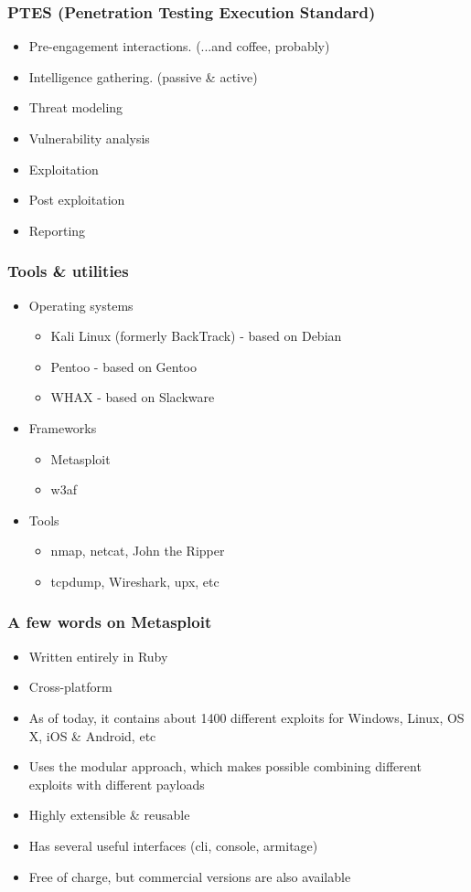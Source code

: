 \documentclass{beamer}
\begin{document}
\begin{frame}
	\frametitle{PTES (Penetration Testing Execution Standard)}
	\begin{itemize} \itemsep3ex
	\item<2-> Pre-engagement interactions. (...and coffee, probably)
	\item<3-> Intelligence gathering. (passive \& active)
	\item<4-> Threat modeling
	\item<5-> Vulnerability analysis
	\item<6-> Exploitation
	\item<7-> Post exploitation
	\item<8> Reporting
	\end{itemize}
\end{frame}

\begin{frame}
	\frametitle{Tools \& utilities}
	\begin{itemize} \itemsep3ex
	\item<2-> Operating systems
		\begin{itemize} \itemsep1ex
		\item<3-> Kali Linux (formerly BackTrack) - based on Debian
		\item<3-> Pentoo - based on Gentoo
		\item<3-> WHAX - based on Slackware
		\end{itemize}
	\item<4-> Frameworks
		\begin{itemize} \itemsep1ex
		\item<5-> Metasploit
		\item<5-> w3af
		\end{itemize}
	\item<6-> Tools
		\begin{itemize} \itemsep1ex
		\item<7-> nmap, netcat, John the Ripper
		\item<7-> tcpdump, Wireshark, upx, etc
		\end{itemize}
	\end{itemize}
\end{frame}

\begin{frame}
	\frametitle{A few words on Metasploit}
	\begin{itemize} \itemsep2ex
	\item<2-> Written entirely in Ruby
	\item<3-> Cross-platform
	\item<4-> As of today, it contains about 1400 different exploits for Windows, Linux, OS X, iOS \& Android, etc
	\item<5-> Uses the modular approach, which makes possible combining different exploits with different payloads
	\item<6-> Highly extensible \& reusable
	\item<7-> Has several useful interfaces (cli, console, armitage)
	\item<8> Free of charge, but commercial versions are also available
	\end{itemize}
\end{frame}
\end{document}
